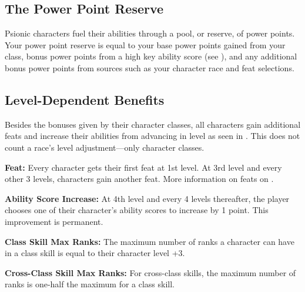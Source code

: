 \subsection{The Power Point Reserve}
Psionic characters fuel their abilities through a pool, or reserve, of power points. Your power point reserve is equal to your base power points gained from your class, bonus power points from a high key ability score (see ), and any additional bonus power points from sources such as your character race and feat selections.

\subsection{Level-Dependent Benefits}
Besides the bonuses given by their character classes, all characters gain additional feats and increase their abilities from advancing in level as seen in . This does not count a race's level adjustment---only character classes.

\textbf{Feat:} Every character gets their first feat at 1st level. At 3rd level and every other 3 levels, characters gain another feat. More information on feats on .

\textbf{Ability Score Increase:} At 4th level and every 4 levels thereafter, the player chooses one of their character's ability scores to increase by 1 point. This improvement is permanent.

\textbf{Class Skill Max Ranks:} The maximum number of ranks a character can have in a class skill is equal to their character level +3.

\textbf{Cross-Class Skill Max Ranks:} For cross-class skills, the maximum number of ranks is one-half the maximum for a class skill.

